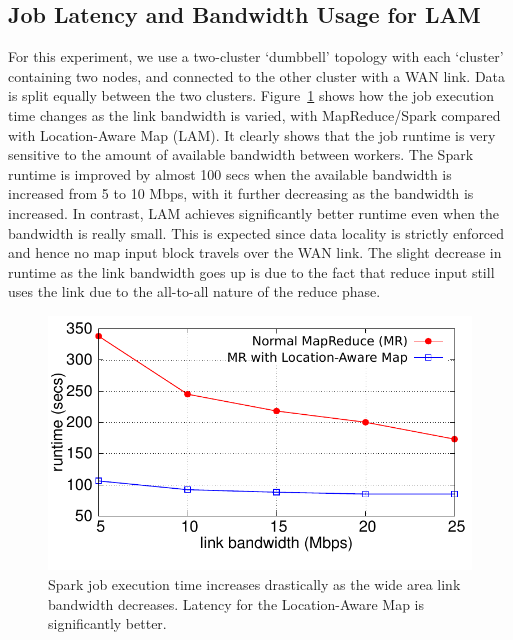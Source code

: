 \subsection{Job Latency and Bandwidth Usage for LAM}
For this experiment, we use a two-cluster `dumbbell' topology with each `cluster' containing two nodes, and
connected to the other cluster with a WAN link. Data is split equally between the two clusters. 
Figure~\ref{fig:job-time-localMap} shows how the job execution time changes as the link bandwidth is varied,  %
with MapReduce/Spark  compared with Location-Aware Map (LAM). 
It clearly shows that the job runtime is very sensitive to the amount of available bandwidth between workers. The Spark runtime is improved by almost 100 secs when the available bandwidth is increased from 5 to 10 Mbps, with it further decreasing as the bandwidth is increased.  
In contrast, LAM achieves significantly better runtime even when the bandwidth is really small. This is expected since data locality is strictly enforced and hence no map input block travels over the WAN link. 
The slight decrease in runtime as the link bandwidth goes up is due to the fact that reduce input still
uses the link due to the all-to-all nature of the reduce phase. 

\begin{figure}[!ht]
\centering\includegraphics[width=\columnwidth]{figs/job-time-localMap.pdf}
\vspace{-1.2em}
\caption{Spark job execution time increases drastically as the wide area link bandwidth decreases. Latency 
for the Location-Aware Map is significantly better.}
\label{fig:job-time-localMap}
\vspace{.7em}
\end{figure}

